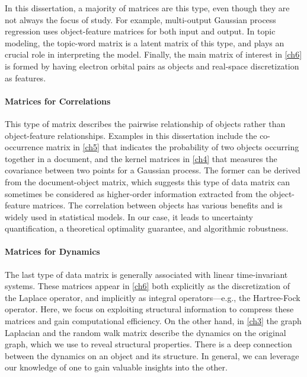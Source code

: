 In this dissertation, a majority of matrices are this type, even though they are
not always the focus of study. For example, multi\hyp{}output Gaussian process
regression uses object\hyp{}feature matrices for both input and output. In topic
modeling, the topic\hyp{}word matrix is a latent matrix of this type, and plays
an crucial role in interpreting the model. Finally, the main matrix of interest
in \cref{ch6} is formed by having electron orbital pairs as objects and 
real\hyp{}space discretization as features.

\paragraph{Matrices for Correlations}

This type of matrix describes the pairwise relationship of objects rather
than object\hyp{}feature relationships. Examples in this dissertation include
the co\hyp{}occurrence matrix in \cref{ch5} that indicates the probability of
two objects occurring together in a document, and the kernel matrices in 
\cref{ch4} that measures the covariance between two points for a Gaussian
process. The former can be derived from the document\hyp{}object matrix, which
suggests this type of data matrix can sometimes be considered as 
higher\hyp{}order information extracted from the object\hyp{}feature matrices.
The correlation between objects has various benefits and is widely used in
statistical models. In our case, it leads to uncertainty quantification,
a theoretical optimality guarantee, and algorithmic robustness.

\paragraph{Matrices for Dynamics}

The last type of data matrix is generally associated with linear 
time\hyp{}invariant systems. These matrices appear in \cref{ch6} both
explicitly as the discretization of the Laplace operator, and implicitly as
integral operators---e.g., the Hartree\hyp{}Fock operator. Here, we focus on
exploiting structural information to compress these matrices and gain
computational efficiency. On the other hand, in \cref{ch3} the graph Laplacian
and the random walk matrix describe the dynamics on the original graph, which we
use to reveal structural properties. There is a deep connection between the
dynamics on an object and its structure. In general, we can leverage our
knowledge of one to gain valuable insights into the other.



